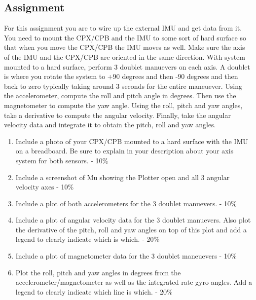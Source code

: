 \subsection{Assignment}

For this assignment you are to wire up the external IMU and get data from it. You need to mount the CPX/CPB and the IMU to some sort of hard surface so that when you move the CPX/CPB the IMU moves as well. Make sure the axis of the IMU and the CPX/CPB are oriented in the same direction. With system mounted to a hard surface, perform 3 doublet manuevers on each axis. A doublet is where you rotate the system to +90 degrees and then -90 degrees and then back to zero typically taking around 3 seconds for the entire maneuever. Using the accelerometer, compute the roll and pitch angle in degrees. Then use the magnetometer to compute the yaw angle. Using the roll, pitch and yaw angles, take a derivative to compute the angular velocity. Finally, take the angular velocity data and integrate it to obtain the pitch, roll and yaw angles. 



\begin{enumerate}[itemsep=-5pt]
\item Include a photo of your CPX/CPB mounted to a hard surface with the IMU on a breadboard. Be sure to explain in your description about your axis system for both sensors. - 10\%
\item Include a screenshot of Mu showing the Plotter open and all 3 angular velocity axes - 10\%
\item Include a plot of both accelerometers for the 3 doublet manuevers. - 10\%
\item Include a plot of angular velocity data for the 3 doublet manuevers. Also plot the derivative of the pitch, roll and yaw angles on top of this plot and add a legend to clearly indicate which is which. - 20\%
\item Include a plot of magnetometer data for the 3 doublet maneuevers - 10\%
\item Plot the roll, pitch and yaw angles in degrees from the accelerometer/magnetometer as well as the integrated rate gyro angles. Add a legend to clearly indicate which line is which. - 20\%
\end{enumerate}
